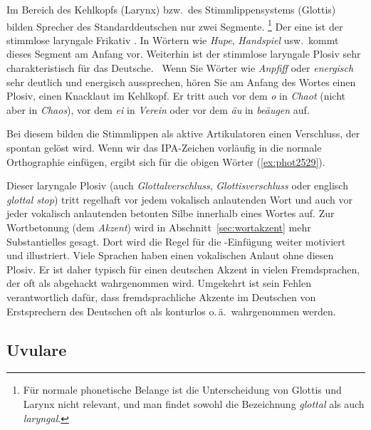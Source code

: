Im Bereich des Kehlkopfs (Larynx) bzw.\ des Stimmlippensystems (Glottis) bilden Sprecher des Standarddeutschen nur zwei Segmente.%
\footnote{Für normale phonetische Belange ist die Unterscheidung von Glottis und Larynx nicht relevant, und man findet sowohl die Bezeichnung \textit{glottal} als auch \textit{laryngal}.}
Der eine ist der stimmlose laryngale Frikativ \textipa{[h]}.
In Wörtern wie \textit{Hupe}, \textit{Handspiel} usw.\ kommt dieses Segment am Anfang vor.
Weiterhin ist der stimmlose laryngale Plosiv \textipa{[P]} sehr charakteristisch für das Deutsche.
\TuBegin~Wenn Sie Wörter wie \textit{Anpfiff} oder \textit{energisch} sehr deutlich und energisch aussprechen, hören Sie am Anfang des Wortes einen Plosiv, einen Knacklaut im Kehlkopf.
Er tritt auch vor dem \textit{o} in \textit{Chaot} (nicht aber in \textit{Chaos}), vor dem \textit{ei} in \textit{Verein} oder vor dem \textit{äu} in \textit{beäugen} auf.

Bei diesem bilden die Stimmlippen als aktive Artikulatoren einen Verschluss, der spontan gelöst wird.
Wenn wir das IPA-Zeichen  vorläufig in die normale Orthographie einfügen, ergibt sich für die obigen Wörter (\ref{ex:phot2529}).

\begin{exe}
  \ex\label{ex:phot2529}
  \begin{xlist}
  \end{xlist}
\end{exe}

Dieser laryngale Plosiv (auch \textit{Glottalverschluss}, \textit{Glottisverschluss} oder englisch \textit{glottal stop}) tritt regelhaft vor jedem vokalisch anlautenden Wort und auch vor jeder vokalisch anlautenden betonten Silbe innerhalb eines Wortes auf.
Zur Wortbetonung (dem \textit{Akzent}) wird in Abschnitt~\ref{sec:wortakzent} mehr Substantielles gesagt.
Dort wird die Regel für die \textipa{[P]}-Einfügung weiter motiviert und illustriert.
Viele Sprachen haben einen vokalischen Anlaut ohne diesen Plosiv.
Er ist daher typisch für einen deutschen Akzent in vielen Fremdsprachen, der oft als abgehackt wahrgenommen wird.
Umgekehrt ist sein Fehlen verantwortlich dafür, dass fremdsprachliche Akzente im Deutschen von Erstsprechern des Deutschen oft als konturlos o.\,ä.\ wahrgenommen werden.

\subsection{Uvulare}

